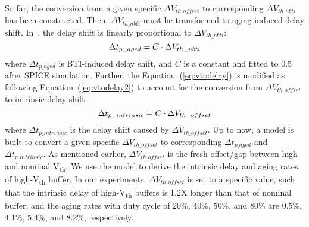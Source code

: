 So far, the conversion from a given specific $\Delta V_{th\_offset}$ to corresponding $\Delta V_{th\_nbti}$ has been constructed. Then, $\Delta V_{th\_nbti}$ must be transformed to aging-induced delay shift. In~\cite{wang2007efficient}, the delay shift is linearly proportional to $\Delta V_{th\_nbti}$:
\begin{equation}
	\centering
	\Delta t_{p\_aged} = C \cdot \Delta V_{th\_nbti}
	\label{eq:vtodelay}
\end{equation}	
where $\Delta t_{p\_aged}$ is BTI-induced delay shift, and $C$ is a constant and fitted to 0.5 after SPICE simulation. Further, the Equation~(\ref{eq:vtodelay}) is modified as following Equation~(\ref{eq:vtodelay2}) to account for the conversion from $\Delta V_{th\_offset}$ to intrinsic delay shift. 
\begin{equation}
	\centering
	\Delta t_{p\_intrinsic} = C \cdot \Delta V_{th\_offset}
	\label{eq:vtodelay2}
\end{equation}	
where $\Delta t_{p\_intrinsic}$ is the delay shift caused by $\Delta V_{th\_offset}$. Up to now, a model is built to convert a given specific $\Delta V_{th\_offset}$ to corresponding $\Delta t_{p\_aged}$ and $\Delta t_{p\_intrinsic}$. As mentioned earlier, $\Delta V_{th\_offset}$ is the fresh offset/gap between high and nominal V\textsubscript{th}. We use the model to derive the intrinsic delay and aging rates of high-V\textsubscript{th} buffer. In our experiments, $\Delta V_{th\_offset}$ is set to a specific value, such that the intrinsic delay of high-V\textsubscript{th} buffers is 1.2X longer than that of nominal buffer, and the aging rates with duty cycle of 20\%, 40\%, 50\%, and 80\% are 0.5\%, 4.1\%, 5.4\%, and 8.2\%, respectively.